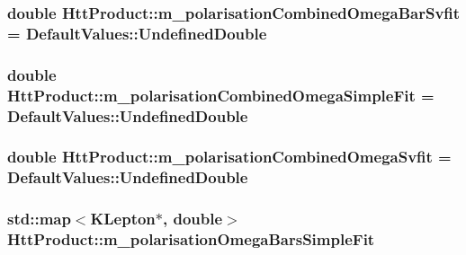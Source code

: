 \label{classHttProduct_a9dfb25a74bfaf26ad2c4da1fee5f7572}
\hypertarget{classHttProduct_a76ad97fa61bb687121369e7eefd46836}{
\subsubsection[{m\_\-polarisationCombinedOmegaBarSvfit}]{\setlength{\rightskip}{0pt plus 5cm}double {\bf HttProduct::m\_\-polarisationCombinedOmegaBarSvfit} = DefaultValues::UndefinedDouble}}
\label{classHttProduct_a76ad97fa61bb687121369e7eefd46836}
\hypertarget{classHttProduct_adf20d7ef58760c4a6ded6a6547315b5c}{
\subsubsection[{m\_\-polarisationCombinedOmegaSimpleFit}]{\setlength{\rightskip}{0pt plus 5cm}double {\bf HttProduct::m\_\-polarisationCombinedOmegaSimpleFit} = DefaultValues::UndefinedDouble}}
\label{classHttProduct_adf20d7ef58760c4a6ded6a6547315b5c}
\hypertarget{classHttProduct_a829ebf0e411d8e2ad1410ccff493db0e}{
\subsubsection[{m\_\-polarisationCombinedOmegaSvfit}]{\setlength{\rightskip}{0pt plus 5cm}double {\bf HttProduct::m\_\-polarisationCombinedOmegaSvfit} = DefaultValues::UndefinedDouble}}
\label{classHttProduct_a829ebf0e411d8e2ad1410ccff493db0e}
\hypertarget{classHttProduct_a2c33c1585a230077b24bc0050ccec598}{
\subsubsection[{m\_\-polarisationOmegaBarsSimpleFit}]{\setlength{\rightskip}{0pt plus 5cm}std::map$<$KLepton$\ast$, double$>$ {\bf HttProduct::m\_\-polarisationOmegaBarsSimpleFit}}}
